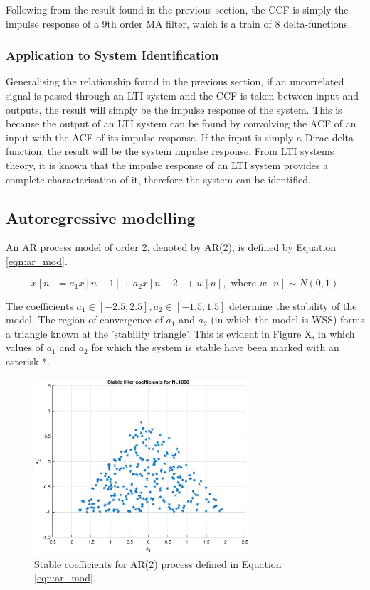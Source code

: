 \noindent
Following from the result found in the previous section, the CCF is simply the impulse response of a 9th order MA filter, which is a train of 8 delta-functions.

\subsubsection{Application to System Identification}

Generalising the relationship found in the previous section, if an uncorrelated signal is passed through an LTI system and the CCF is taken between input and outputs, the result will simply be the impulse response of the system. This is because the output of an LTI system can be found by convolving the ACF of an input with the ACF of its impulse response. If the input is simply a Dirac-delta function, the result will be the system impulse response. From LTI systems theory, it is known that the impulse response of an LTI system provides a complete characterisation of it, therefore the system can be identified.

\subsection{Autoregressive modelling}

An AR process model of order 2, denoted by AR(2), is defined by Equation \ref{eqn:ar_mod}.

\begin{equation}
x[n]=a_{1} x[n-1]+a_{2} x[n-2]+w[n], \text { where } w[n] \sim N(0,1)
\label{eqn:ar_mod}
\end{equation}

\noindent
The coefficients $a_{1} \in [-2.5,2.5] ,a_{2} \in [-1.5,1.5]$ determine the stability of the model. The region of convergence of $a_{1}$ and $a_{2}$  (in which the model is WSS) forms a triangle known at the 'stability triangle'. This is evident in Figure X, in which values of $a_{1}$ and $a_{2}$ for which the system is stable have been marked with an asterisk *.

\begin{figure}[H]
    \centering
    \includegraphics[width=8cm]{assignment2figs/stablecoeffs.eps}
    \caption{Stable coefficients for AR(2) process defined in Equation \ref{eqn:ar_mod}.}
    \label{fig:triangle}
\end{figure}

